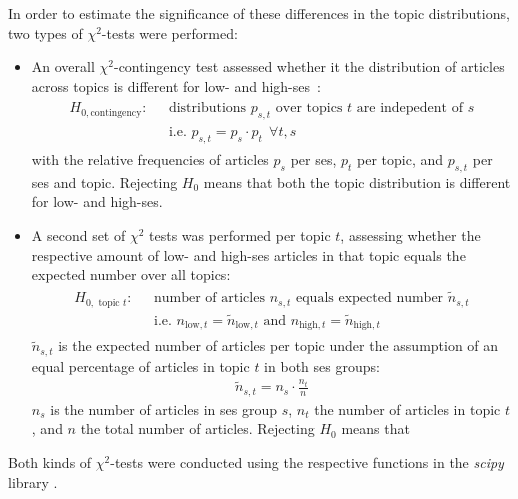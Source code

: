 In order to estimate the significance of these differences in the topic distributions, two types of $\chi^2$-tests were performed:
\begin{itemize}
    \item An overall $\chi^2$-contingency test assessed whether it the distribution of articles across topics is different for low- and high-\gls{ses}~\autocite[p. 430]{fahrmeir_spezielle_2016}:
    \begin{align}
        \begin{split}\label{eq:h0_contingency}
            H_{0, \text{contingency}}: ~~~ &\text{distributions } p_{s, t} \text{ over topics } t \text{ are indepedent of } s\\
        & \text{i.e. } p_{s, t} = p_s \cdot p_t ~~ \forall t, s
        \end{split}
    \end{align}
    with the relative frequencies of articles $p_s$ per \gls{ses}, $p_t$ per topic, and $p_{s, t}$ per \gls{ses} and topic. Rejecting $H_0$ means that both the topic distribution is different for low- and high-\gls{ses}.

    \item A second set of $\chi^2$ tests was performed per topic $t$, assessing whether the respective amount of low- and high-\gls{ses} articles in that topic equals the expected number over all topics:
    \begin{align}
        \begin{split}\label{eq:h0_topic}
            H_{0, \text{ topic }t}: ~~~ &\text{number of articles } n_{s, t} \text{ equals expected number } \tilde n_{s, t} \\
            & \text{i.e. } n_{\text{low}, t} = \tilde n_{\text{low}, t} \text{ and } n_{\text{high}, t} = \tilde n_{\text{high}, t}
        \end{split}
    \end{align}
    $\tilde n_{s, t}$ is the expected number of articles per topic under the assumption of an equal percentage of articles in topic $t$ in both \gls{ses} groups:
    \begin{align}
        \tilde n_{s, t} = n_s \cdot \frac{n_t}{n}
    \end{align}
    $n_s$ is the number of articles in \gls{ses} group $s$, $n_t$ the number of articles in topic $t$, and $n$ the total number of articles. Rejecting $H_0$ means that 
\end{itemize}

Both kinds of $\chi^2$-tests were conducted using the respective functions in the \textit{scipy} library \autocite{scipychi2_scipy_nodate,scipychi2_contingency_scipy_nodate}.

